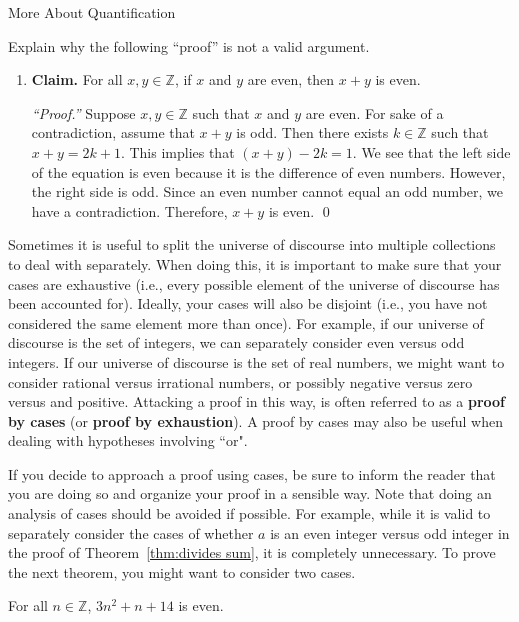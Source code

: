 \begin{section}{More About Quantification}
\begin{problem}
Explain why the following ``proof'' is not a valid argument.
\begin{enumerate}
\item[] \textbf{Claim.}  For all $x,y\in \mathbb{Z}$, if $x$ and $y$ are even, then $x+y$ is even.

\bigskip

\emph{``Proof.''}  Suppose $x, y \in \mathbb{Z}$ such that $x$ and $y$ are even.  For sake of a contradiction, assume that $x+y$ is odd.  Then there exists $k \in \mathbb{Z}$ such that $x+y=2k+1$.  This implies that $(x+y)-2k=1$.  We see that the left side of the equation is even because it is the difference of even numbers.  However, the right side is odd.  Since an even number cannot equal an odd number, we have a contradiction.  Therefore, $x+y$ is even.  \qed %
\end{enumerate}

\end{problem}

Sometimes it is useful to split the universe of discourse into multiple collections to deal with separately.  When doing this, it is important to make sure that your cases are exhaustive (i.e., every possible element of the universe of discourse has been accounted for).  Ideally, your cases will also be disjoint (i.e., you have not considered the same element more than once).  For example, if our universe of discourse is the set of integers, we can separately consider even versus odd integers. If our universe of discourse is the set of real numbers, we might want to consider rational versus irrational numbers, or possibly negative versus zero versus and positive. Attacking a proof in this way, is often referred to as a \textbf{proof by cases} (or \textbf{proof by exhaustion}). A proof by cases may also be useful when dealing with hypotheses involving ``or".

If you decide to approach a proof using cases, be sure to inform the reader that you are doing so and organize your proof in a sensible way. Note that doing an analysis of cases should be avoided if possible. For example, while it is valid to separately consider the cases of whether $a$ is an even integer versus odd integer in the proof of Theorem~\ref{thm:divides sum}, it is completely unnecessary.  To prove the next theorem, you might want to consider two cases.

\begin{theorem}\label{thm:3n^2+n+14 is even}
For all $n\in \mathbb{Z}$, $3n^2+n+14$ is even.
\end{theorem}


\end{section}
